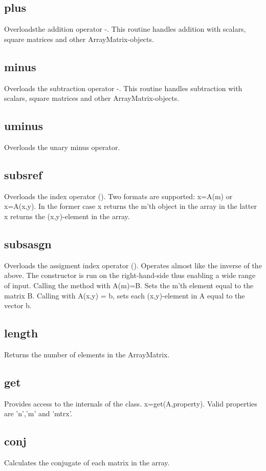 \documentclass[11pt]{article}
\begin{document}
\subsection*{plus}
Overloadsthe addition operator -. This routine handles addition with scalars, square matrices and other ArrayMatrix-objects. 

\subsection*{minus}
Overloads the subtraction operator -. This routine handles subtraction with scalars, square matrices and other ArrayMatrix-objects. 

\subsection*{uminus}
Overloads the unary minus operator.

\subsection*{subsref}
Overloads the index operator (). Two formats are supported: x=A(m) or x=A(x,y). In the former case x returns the m'th object in the array in the latter x returns the (x,y)-element in the array.

\subsection*{subsasgn}
Overloads the assigment index operator (). Operates almost like the inverse of the above. The constructor is run on the right-hand-side thus enabling a wide range of input. Calling the method with A(m)=B. Sets the m'th element equal to the matrix B. Calling with A(x,y) = b, sets each (x,y)-element in A equal to the vector b.

\subsection*{length}
Returns the number of elements in the ArrayMatrix.

\subsection*{get}
Provides access to the internals of the class. x=get(A,property). Valid properties are 'n','m' and 'mtrx'.

\subsection*{conj}
Calculates the conjugate of each matrix in the array.
\end{document}
